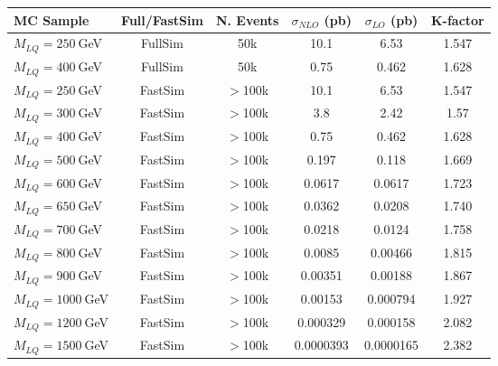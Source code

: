 \begin{table}[htb]
  \label{tab:NumEvents}
  \begin{center}
    \begin{tabular}{|l|ccccc|} \hline\hline
      MC Sample                 & Full/FastSim & N. Events    & $\sigma_{NLO}$ (pb) & $\sigma_{LO}$ (pb) & K-factor \\ \hline\hline
      $M_{LQ}=250~$GeV          & FullSim      & 50k          & 10.1                & 6.53               & 1.547\\
      $M_{LQ}=400~$GeV          & FullSim      & 50k          &  0.75               & 0.462              & 1.628\\ \hline
      $M_{LQ}=250~$GeV          & FastSim      & $>$100k      & 10.1                & 6.53               & 1.547\\
      $M_{LQ}=300~$GeV          & FastSim      & $>$100k      &  3.8                & 2.42               & 1.57\\
      $M_{LQ}=400~$GeV          & FastSim      & $>$100k      &  0.75               & 0.462              & 1.628\\
      $M_{LQ}=500~$GeV          & FastSim      & $>$100k      &  0.197              & 0.118              & 1.669\\
      $M_{LQ}=600~$GeV          & FastSim      & $>$100k      &  0.0617             & 0.0617             & 1.723\\
      $M_{LQ}=650~$GeV          & FastSim      & $>$100k      &  0.0362             & 0.0208             & 1.740\\
      $M_{LQ}=700~$GeV          & FastSim      & $>$100k      &  0.0218             & 0.0124             & 1.758\\
      $M_{LQ}=800~$GeV          & FastSim      & $>$100k      &  0.0085             & 0.00466            & 1.815\\
      $M_{LQ}=900~$GeV          & FastSim      & $>$100k      &  0.00351            & 0.00188            & 1.867\\
      $M_{LQ}=1000~$GeV         & FastSim      & $>$100k      &  0.00153            & 0.000794           & 1.927\\
      $M_{LQ}=1200~$GeV         & FastSim      & $>$100k      &  0.000329           & 0.000158           & 2.082\\
      $M_{LQ}=1500~$GeV         & FastSim      & $>$100k      &  0.0000393          & 0.0000165          & 2.382\\ \hline

\end{tabular}
\end{center}
\end{table}
